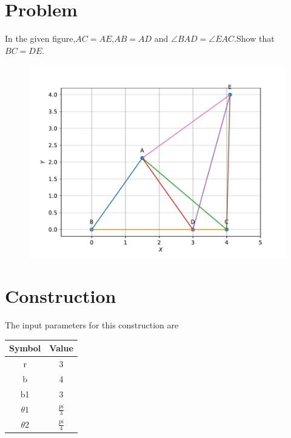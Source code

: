 \documentclass[10pt,a4paper]{article}
\title{\mytitle}
\begin{document}
	\maketitle
	\tableofcontents
	
\section{Problem}	
In the given figure,$AC =AE$,$AB=AD$ and $\angle BAD=\angle EAC$.Show that $BC=DE$.
\begin{figure}[!h]
	\begin{center}
		\includegraphics[width=\columnwidth]{./fig/fig.pdf}
	\end{center}
\caption{}
\label{figure}
\end{figure}


\section{Construction}

\begin{center}

The input parameters for this construction are

\begin{tabular}{|c|c|}
	\hline
	\textbf{Symbol}&\textbf{Value}\\
	\hline
	r&3\\
	\hline
    b&4\\
    \hline
	b1&3\\
	\hline
	$\theta1$&$\frac{pi}{3}$\\
	\hline
	$\theta2$&$\frac{pi}{4}$\\
	\hline
	
\end{tabular}
\end{center}
\end{document}
